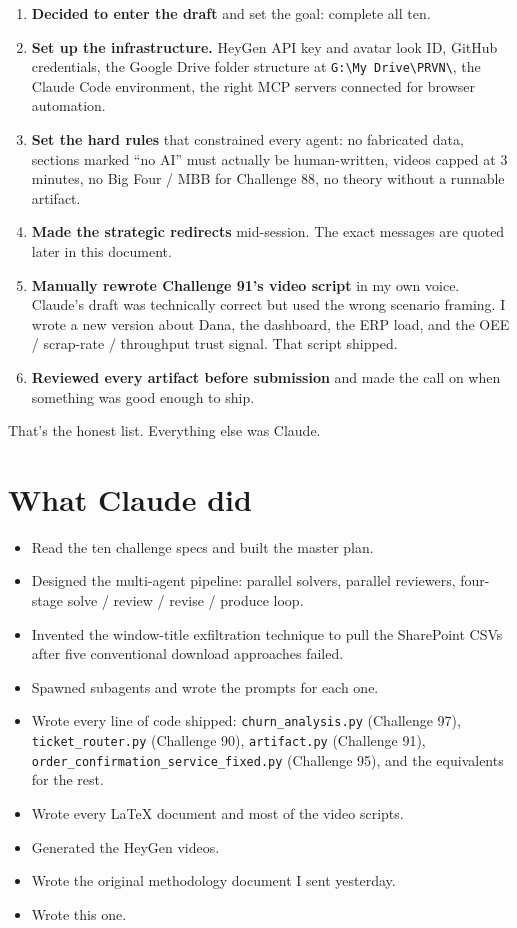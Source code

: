 \documentclass[12pt, letterpaper]{article}
\begin{document}
\begin{enumerate}[leftmargin=1.5em]
\item \textbf{Decided to enter the draft} and set the goal: complete all ten.
\item \textbf{Set up the infrastructure.} HeyGen API key and avatar look ID, GitHub credentials, the Google Drive folder structure at \texttt{G:\textbackslash{}My Drive\textbackslash{}PRVN\textbackslash{}}, the Claude Code environment, the right MCP servers connected for browser automation.
\item \textbf{Set the hard rules} that constrained every agent: no fabricated data, sections marked ``no AI'' must actually be human-written, videos capped at 3 minutes, no Big Four / MBB for Challenge 88, no theory without a runnable artifact.
\item \textbf{Made the strategic redirects} mid-session. The exact messages are quoted later in this document.
\item \textbf{Manually rewrote Challenge 91's video script} in my own voice. Claude's draft was technically correct but used the wrong scenario framing. I wrote a new version about Dana, the dashboard, the ERP load, and the OEE / scrap-rate / throughput trust signal. That script shipped.
\item \textbf{Reviewed every artifact before submission} and made the call on when something was good enough to ship.
\end{enumerate}

That's the honest list. Everything else was Claude.

\section{What Claude did}

\begin{itemize}[leftmargin=1.5em]
\item Read the ten challenge specs and built the master plan.
\item Designed the multi-agent pipeline: parallel solvers, parallel reviewers, four-stage solve / review / revise / produce loop.
\item Invented the window-title exfiltration technique to pull the SharePoint CSVs after five conventional download approaches failed.
\item Spawned subagents and wrote the prompts for each one.
\item Wrote every line of code shipped: \texttt{churn\_analysis.py} (Challenge 97), \texttt{ticket\_router.py} (Challenge 90), \texttt{artifact.py} (Challenge 91), \texttt{order\_confirmation\_service\_fixed.py} (Challenge 95), and the equivalents for the rest.
\item Wrote every LaTeX document and most of the video scripts.
\item Generated the HeyGen videos.
\item Wrote the original methodology document I sent yesterday.
\item Wrote this one.
\end{itemize}
\end{document}
